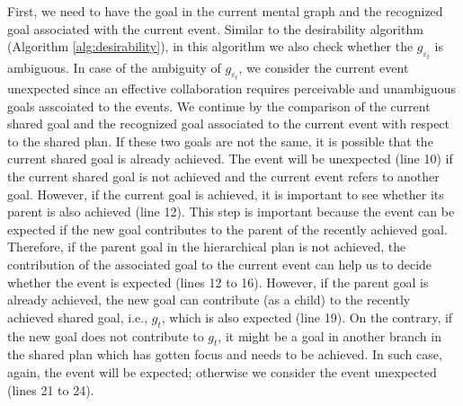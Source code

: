 \documentclass[letterpaper]{article}
\begin{document}
First, we need to have the goal in the current mental graph and the recognized
goal associated with the current event. Similar to the desirability algorithm
(Algorithm \ref{alg:desirability}), in this algorithm we also check whether the
$\mathit{g}_{\varepsilon_t}$ is ambiguous. In case of the ambiguity of
$\mathit{g}_{\varepsilon_t}$, we consider the current event unexpected since an
effective collaboration requires perceivable and unambiguous goals asscoiated to
the events. We continue by the comparison of the current shared goal and the
recognized goal associated to the current event with respect to the shared plan.
If these two goals are not the same, it is possible that the current shared goal
is already achieved. The event will be unexpected (line 10) if the current
shared goal is not achieved and the current event refers to another goal.
However, if the current goal is achieved, it is important to see whether its
parent is also achieved (line 12). This step is important because the event can
be expected if the new goal contributes to the parent of the recently achieved
goal. Therefore, if the parent goal in the hierarchical plan is not achieved,
the contribution of the associated goal to the current event can help us to
decide whether the event is expected (lines 12 to 16). However, if the parent
goal is already achieved, the new goal can contribute (as a child) to the
recently achieved shared goal, i.e., $\mathit{g}_{t}$, which is also expected
(line 19). On the contrary, if the new goal does not contribute to
$\mathit{g}_{t}$, it might be a goal in another branch in the shared plan which
has gotten focus and needs to be achieved. In such case, again, the event will
be expected; otherwise we consider the event unexpected (lines 21 to 24).
\end{document}
